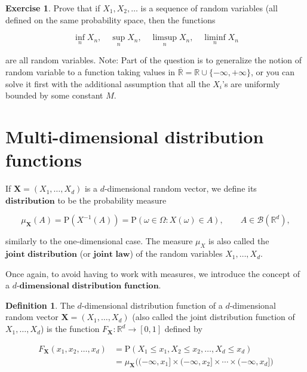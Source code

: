 \documentclass[11pt]{report}
\providecommand{\cal}{\mathcal}
\newcommand{\R}{\mathbb{R}}
\theoremstyle{plain}
\theoremstyle{definition}
\newtheorem{defn}[thm]{Definition}
\newtheorem{xexercise}[thm]{Exercise}
\begin{document}
\begin{xexercise}
Prove that if $X_1, X_2, \ldots$ is a sequence of
random variables (all defined on the same probability
space, then the functions

\[
\inf_n X_n, \quad \sup_n X_n, \quad \limsup_n X_n, \quad \liminf_n X_n
\]

\noindent are all random variables. Note: Part of the question
is to generalize the notion of random variable to a
function taking values in
$\overline{\mathbb{R}} = \R \cup \{-\infty, +\infty
\}$,
or you can solve it first with the additional
assumption that all the $X_i$'s are uniformly bounded
by some constant $M$.
\end{xexercise}

\section{Multi-dimensional distribution functions}

If $\mathbf{X}=(X_1,\ldots,X_d)$ is a $d$-dimensional
random vector, we define its $\textbf{distribution}$
to be the probability measure

\[
\mu_{\mathbf{X}}(A) = \mathrm{P}(X^{-1}(A)) = \mathrm{P}(\omega \in \Omega : X(\omega) \in A),
\qquad A \in {\cal B}(\R^d),
\]

\noindent similarly to the one-dimensional case. The measure
$\mu_X$ is also called the
$\textbf{joint distribution}$ (or
$\textbf{joint law}$) of the random variables
$X_1,\ldots,X_d$.

Once again, to avoid having to work with measures, we
introduce the concept of a $\textbf{$d
$-dimensional distribution function}$.

\begin{defn}
The $d$-dimensional distribution function of a
$d$-dimensional random vector
$\mathbf{X}=(X_1,\ldots,X_d)$ (also called the joint
distribution function of $X_1,\ldots,X_d$) is the
function $F_{\mathbf{X}}:\R^d\to[0,1]$ defined by

\begin{align*}
F_{\mathbf{X}}(x_1,x_2,\ldots,x_d)
&= \mathrm{P}( X_1 \le x_1, X_2 \le x_2, \ldots, X_d \le x_d) \\
&= \mu_{\mathbf{X}}\Big( (-\infty,x_1] \times (-\infty,x_2] \times \cdots \times (-\infty,x_d] \Big)
\end{align*}

\end{defn}
\end{document}
